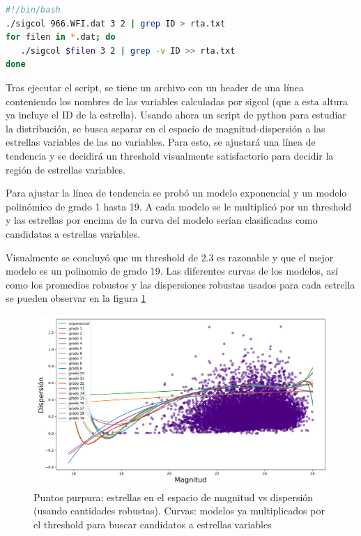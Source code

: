 \documentclass[12pt]{article}
\begin{document}
\begin{lstlisting}[language=bash]
#!/bin/bash
./sigcol 966.WFI.dat 3 2 | grep ID > rta.txt
for filen in *.dat; do
   ./sigcol $filen 3 2 | grep -v ID >> rta.txt
done
\end{lstlisting}

Tras ejecutar el script, se tiene un archivo  con un header de una línea conteniendo los nombres de las variables calculadas por sigcol (que a esta altura ya incluye el ID de la estrella). 
Usando ahora un script de python para estudiar la distribución, se busca separar en el espacio de magnitud-dispersión a las estrellas variables de las no variables. Para esto, se ajustará una línea de tendencia y se decidirá un threshold visualmente satisfactorio para decidir la región de estrellas variables.

Para ajustar la línea de tendencia se probó un modelo exponencial y un modelo polinómico de grado 1 hasta 19. A cada modelo se le multiplicó por un threshold y las estrellas por encima de la curva del modelo serían clasificadas como candidatas a estrellas variables.

Visualmente se concluyó que un threshold de 2.3 es razonable y que el mejor modelo es un polinomio de grado 19. Las diferentes curvas de los modelos, así como los promedios robustos y las dispersiones robustas usados para cada estrella se pueden observar en la figura \ref{figura}


\begin{figure}[H]
  \centering
   \includegraphics[scale = 0.6]{fits.png}
  \caption{Puntos purpura: estrellas en el espacio de magnitud vs dispersión (usando cantidades robustas). Curvas: modelos ya multiplicados por el threshold para buscar candidatos a estrellas variables }
  \label{figura}
\end{figure}
\end{document}
